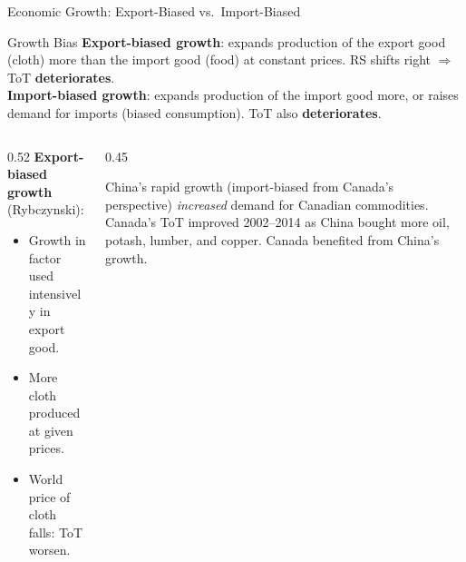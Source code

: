 \documentclass[aspectratio=169]{beamer}
\begin{document}
\begin{frame}{Economic Growth: Export-Biased vs.\ Import-Biased}
\begin{block}{Growth Bias}
\textbf{Export-biased growth}: expands production of the export good (cloth) more than the import good (food) at constant prices. RS shifts right $\Rightarrow$ ToT \textbf{deteriorates}.\\[0.3em]
\textbf{Import-biased growth}: expands production of the import good more, or raises demand for imports (biased consumption). ToT also \textbf{deteriorates}.
\end{block}
\vspace{0.3em}
\begin{columns}
\begin{column}{0.52\textwidth}
\textbf{Export-biased growth} (Rybczynski):
\begin{itemize}
  \item Growth in factor used intensively in export good.
  \item More cloth produced at given prices.
  \item World price of cloth falls: ToT worsen.
\end{itemize}
\end{column}
\begin{column}{0.45\textwidth}
\begin{canadex}
  China's rapid growth (import-biased from Canada's perspective) \emph{increased} demand for Canadian commodities. Canada's ToT improved 2002--2014 as China bought more oil, potash, lumber, and copper. Canada benefited from China's growth.
\end{canadex}
\end{column}
\end{columns}
\end{frame}
\end{document}
